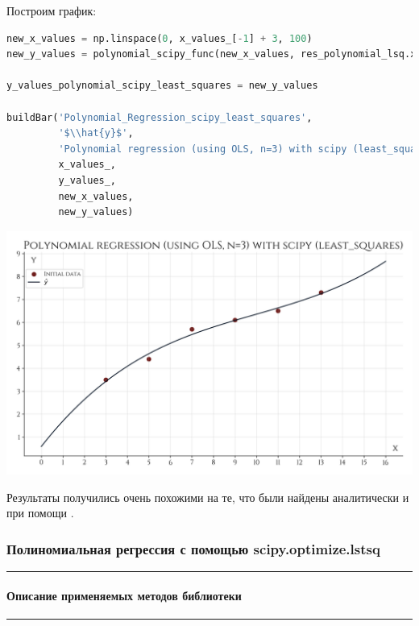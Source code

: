 \documentclass[a4paper, 14pt]{extarticle}
\begin{document}
Построим график:

\begin{center}
    \begin{lstlisting}[language=Python]
new_x_values = np.linspace(0, x_values_[-1] + 3, 100)
new_y_values = polynomial_scipy_func(new_x_values, res_polynomial_lsq.x)

y_values_polynomial_scipy_least_squares = new_y_values

buildBar('Polynomial_Regression_scipy_least_squares', 
         '$\\hat{y}$', 
         'Polynomial regression (using OLS, n=3) with scipy (least_squares)', 
         x_values_, 
         y_values_, 
         new_x_values, 
         new_y_values)
    \end{lstlisting}
\end{center}

\begin{center}
    \includegraphics[width=1\textwidth, height=1\textheight, keepaspectratio]{Polynomial_Regression_scipy_least_squares} \\
\end{center}

Результаты получились очень похожими на те, что были найдены аналитически и при помощи .

\subsubsection*{{Полиномиальная регрессия с помощью scipy.optimize.lstsq}}\vspace{-20pt}\rule{\linewidth}{0.1mm}
\vspace{-30pt}\paragraph*{{Описание применяемых методов библиотеки}}\vspace{-20pt}\rule{\linewidth}{0.1mm}
\end{document}

